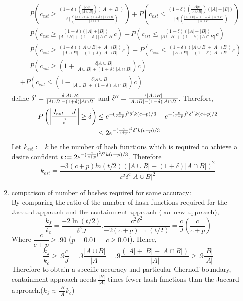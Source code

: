 \documentclass[11pt]{amsart}
\theoremstyle{remark}
\numberwithin{equation}{section}
\begin{document}
\begin{enumerate}
\begin{align*}
&= P\left(c_{est}\geq\frac{ (1+\delta)(\frac{|A|c}{|A\cup B|})(|A|+|B|)}{|A|(\frac{|A\cup B|+(1+\delta)|A \cap B|}{|A\cup B|})} \right)+P\left(c_{est}\leq\frac{ (1-\delta)(\frac{|A|c}{|A\cup B|})(|A|+|B|)}{|A|(\frac{|A\cup B|+(1-\delta)|A \cap B|}{|A\cup B|})} \right)\\
&= P\left(c_{est}\geq\frac{ (1+\delta)(|A|+|B|)}{|A\cup B|+(1+\delta)|A \cap B|} c \right)+P\left(c_{est}\leq\frac{ (1-\delta)(|A|+|B|)}{|A\cup B|+(1-\delta)|A \cap B|} c \right)\\
&= P\left(c_{est}\geq\frac{ (1+\delta)(|A \cup B|+|A \cap B|)}{|A\cup B|+(1+\delta)|A \cap B|} c \right)+P\left(c_{est}\leq\frac{ (1-\delta)(|A \cup B|+|A \cap B|)}{|A\cup B|+(1-\delta)|A \cap B|} c \right)\\
&= P\left(c_{est}\geq\left(1+\frac{\delta |A \cup B|}{|A\cup B|+(1+\delta)|A \cap B|}\right) c \right)\\
&+P\left(c_{est}\leq\left(1-\frac{ \delta |A \cup B|}{|A\cup B|+(1-\delta)|A \cap B|}\right) c \right)\\
\end{align*}
define $\delta\rq{}= \frac{\delta |A \cup B|}{|A\cup B|+(1+\delta)|A \cap B|}$ and $\delta\rq{}\rq{}=\frac{\delta |A \cup B|}{|A\cup B|+(1-\delta)|A \cap B|}$. Therefore,
\begin{align*}
P\left(\left|\frac{J_{est}-J}{J}\right|\geq \delta\right) &\leq e^{-(\frac{c}{c+p})^2\delta\rq{}k(c+p)/3}+e^{-(\frac{c}{c+p})^2\delta\rq{}\rq{}k(c+p)/2}\\
&\leq 2e^{-(\frac{c}{c+p})^2\delta\rq{}k(c+p)/3}
\end{align*}
Let $k_{est}:=k$ be the number of hash functions which is required to achieve a desire confident $t:=2e^{-(\frac{c}{c+p})^2\delta\rq{}k(c+p)/3}$. Therefore
 $$k_{est} =\frac{-3(c+p)ln(t/2)\left(|A\cup B|+(1+\delta)|A\cap B|\right)^2}{c^2\delta^2|A\cup B|^2 } $$
\item comparison of number of hashes required for same accuracy:\\
By comparing the ratio of the number of hash functions required for the Jaccard approach and the containment approach (our new approach), 
$$\dfrac{k_J}{k_c}=\dfrac{-2\ln(t/2)}{\delta^2 J}.\dfrac{c^2\delta^2}{-2(c+p)\ln(t/2)}=\dfrac{c}{J}\left(\dfrac{c}{c+p}\right)$$
Where $ \dfrac{c}{c+p}\geq.90$ ($p=0.01,\quad c\geq0.01$). Hence,
$$\dfrac{k_J}{k_c}\geq .9\frac{c}{J}=.9 \dfrac{|A\cup B|}{|A|}=.9 \dfrac{(|A|+|B|-|A\cap B|)}{|A|}\geq .9 \dfrac{|B|}{|A|}$$
Therefore to obtain a specific accuracy and particular Chernoff boundary, containment approach needs $\frac{|B|}{|A|}$ times fewer hash functions than the Jaccard approach.($k_J \approx\frac{|B|}{|A|}k_c$)\\

\end{enumerate}
\end{document}
